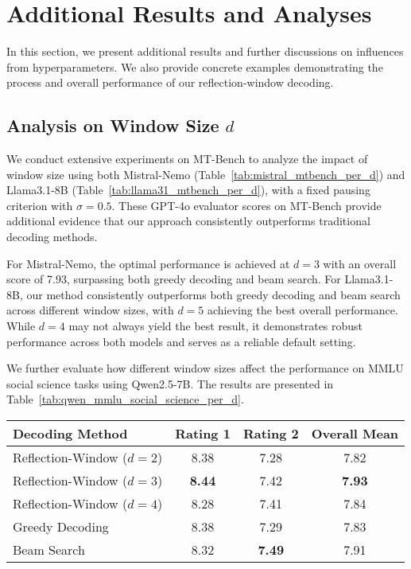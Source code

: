 \section{Additional Results and Analyses}
In this section, we present additional results and further discussions on influences from hyperparameters.
We also provide concrete examples demonstrating the process and overall performance of our reflection-window decoding.

\subsection{Analysis on Window Size $d$}
We conduct extensive experiments on MT-Bench to analyze the impact of window size using both Mistral-Nemo (Table~\ref{tab:mistral_mtbench_per_d}) and Llama3.1-8B (Table~\ref{tab:llama31_mtbench_per_d}), with a fixed pausing criterion with $\sigma=0.5$.
These GPT-4o evaluator scores on MT-Bench provide additional evidence that our approach consistently outperforms traditional decoding methods.

For Mistral-Nemo, the optimal performance is achieved at $d=3$ with an overall score of 7.93, surpassing both greedy decoding and beam search.
For Llama3.1-8B, our method consistently outperforms both greedy decoding and beam search across different window sizes, with $d=5$ achieving the best overall performance.
While $d=4$ may not always yield the best result, it demonstrates robust performance across both models and serves as a reliable default setting.

We further evaluate how different window sizes affect the performance on MMLU social science tasks using Qwen2.5-7B.
The results are presented in Table~\ref{tab:qwen_mmlu_social_science_per_d}.

\begin{table*}[t]
    \centering
    \caption{Performance across different window sizes $d$ on MT-Bench with Mistral-Nemo}
    \label{tab:mistral_mtbench_per_d}
    \begin{tabular}{lccc}
        \toprule
        \textbf{Decoding Method}  & \textbf{Rating 1} & \textbf{Rating 2} & \textbf{Overall Mean} \\
        \midrule
        Reflection-Window ($d=2$) & 8.38              & 7.28              & 7.82                  \\
        Reflection-Window ($d=3$) & \textbf{8.44}     & 7.42              & \textbf{7.93}         \\
        Reflection-Window ($d=4$) & 8.28              & 7.41              & 7.84                  \\
        Greedy Decoding           & 8.38              & 7.29              & 7.83                  \\
        Beam Search               & 8.32              & \textbf{7.49}     & 7.91                  \\
        \bottomrule
    \end{tabular}
\end{table*}

